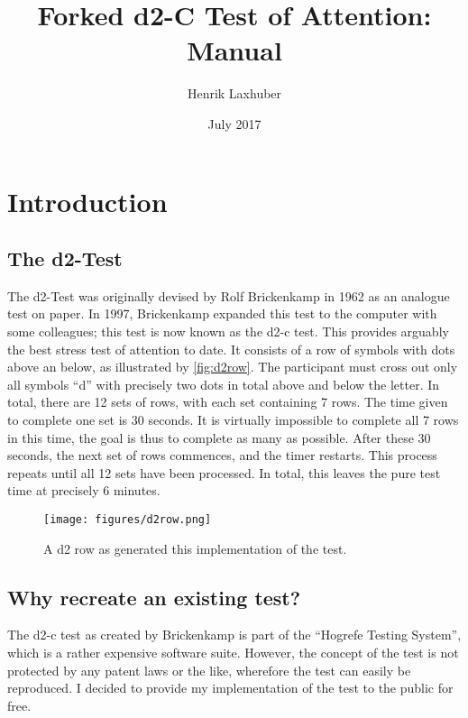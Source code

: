 \documentclass[a4paper,11pt,british,oneside]{article}
\begin{document}
\title{Forked d2-C Test of Attention: Manual}
\author{Henrik Laxhuber}
\date{July 2017}

\maketitle

\makeatletter
{}
\makeatother

\tableofcontents

\section{Introduction}
\subsection{The d2-Test}
The d2-Test was originally devised by Rolf Brickenkamp in 1962 as an analogue test on paper. In 1997, Brickenkamp expanded this test to the computer with some colleagues; this test is now known as the d2-c test. This provides arguably the best stress test of attention to date. It consists of a row of symbols with dots above an below, as illustrated by \autoref{fig:d2row}. The participant must cross out only all symbols \enquote{d} with precisely two dots in total above and below the letter. In total, there are 12 sets of rows, with each set containing 7 rows. The time given to complete one set is 30 seconds. It is virtually impossible to complete all 7 rows in this time, the goal is thus to complete as many as possible. After these 30 seconds, the next set of rows commences, and the timer restarts. This process repeats until all 12 sets have been processed. In total, this leaves the pure test time at precisely 6 minutes.

\begin{figure}
	\centering
	\caption{A d2 row as generated this implementation of the test.}\label{fig:d2row}
	\texttt{[image: figures/d2row.png]}
\end{figure}

\subsection{Why recreate an existing test?}
The d2-c test as created by Brickenkamp is part of the \enquote{Hogrefe Testing System}, which is a rather expensive software suite. However, the concept of the test is not protected by any patent laws or the like, wherefore the test can easily be reproduced. I decided to provide my implementation of the test to the public for free.
\end{document}
